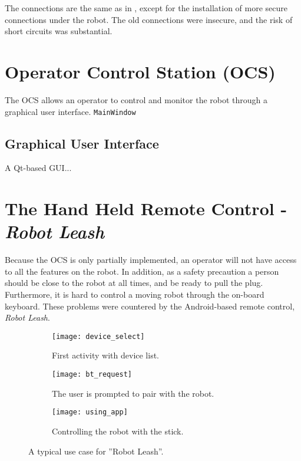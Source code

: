 
The connections are the same as in \cite{aspunvik}, except for the installation of more secure connections under the robot. The old connections were insecure, and the risk of short circuits was substantial.

\section{Operator Control Station (OCS)}

The \ac{OCS} allows an operator to control and monitor the robot through a graphical user interface. \texttt{MainWindow}

\subsection{Graphical User Interface}

A Qt-based \ac{GUI}...

\section{The Hand Held Remote Control - \textit{Robot Leash}}

Because the \ac{OCS} is only partially implemented, an operator will not have access to all the features on the robot. In addition, as a safety precaution a person should be close to the robot at all times, and be ready to pull the plug. Furthermore, it is hard to control a moving robot through the on-board keyboard. These problems were countered by the Android-based remote control, \textit{Robot Leash}. 


\begin{figure}
	\centering
	\begin{subfigure}[b]{0.30\textwidth}
		\texttt{[image: device\_select]}
		\caption{First activity with device list.}
		\label{fig:device_select}
	\end{subfigure}
		\begin{subfigure}[b]{0.30\textwidth}
			\texttt{[image: bt\_request]}
			\caption{The user is prompted to pair with the robot.}
			\label{fig:bt_request}
		\end{subfigure}
	\begin{subfigure}[b]{0.30\textwidth}
		\texttt{[image: using\_app]}
		\caption{Controlling the robot with the stick.}
		\label{fig:using_app}
	\end{subfigure}
	\caption{\label{fig:app_screens}A typical use case for ''Robot Leash''.}
\end{figure}

